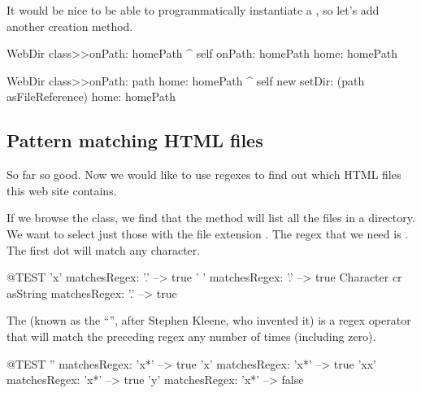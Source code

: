 \documentclass[a4paper,10pt,twoside]{book}
\begin{document}

It would be nice to be able to programmatically instantiate a , so let's add another creation method.


\begin{code}{}
WebDir class>>onPath: homePath
	^ self onPath: homePath home: homePath

WebDir class>>onPath: path home: homePath
	^ self new setDir: (path asFileReference) home: homePath
\end{code}

\subsection{Pattern matching HTML files}

So far so good.
Now we would like to use regexes to find out which HTML files this web site contains.

If we browse the  class, we find that the method  will list all the files in a directory. We want to select just those with the file extension . The regex that we need is . The first dot will match any character.

\begin{code}{@TEST}
'x' matchesRegex: '.' --> true
' ' matchesRegex: '.'  --> true
Character cr asString matchesRegex: '.' --> true
\end{code}

The \ct{*} (known as the ``'', after Stephen Kleene, who invented it) is a regex operator that will match the preceding regex any number of times (including zero).

\begin{code}{@TEST}
'' matchesRegex: 'x*'     --> true
'x' matchesRegex: 'x*'   --> true
'xx' matchesRegex: 'x*' --> true
'y' matchesRegex: 'x*'   --> false
\end{code}
\end{document}
